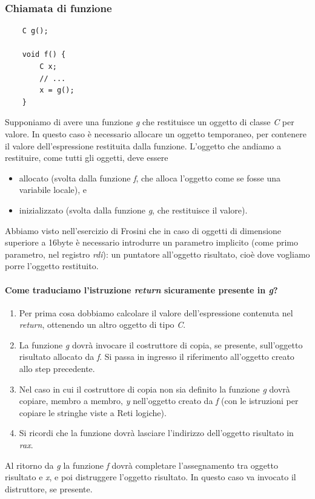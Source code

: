 \subsubsection{Chiamata di funzione}
\begin{verbatim}
	C g();
	
	void f() {
		C x;
		// ...
		x = g();
	}
\end{verbatim}
Supponiamo di avere una funzione \emph{g} che restituisce un oggetto di classe \emph{C} per valore. In questo caso è necessario allocare un oggetto temporaneo, per contenere il valore dell'espressione restituita dalla funzione. L'oggetto che andiamo a restituire, come tutti gli oggetti, deve essere 
\begin{itemize}
	\item allocato (svolta dalla funzione \emph{f}, che alloca l'oggetto come se fosse una variabile locale), e
	\item inizializzato (svolta dalla funzione \emph{g},  che restituisce il valore).
\end{itemize}
Abbiamo visto nell'esercizio di Frosini che in caso di oggetti di dimensione superiore a 16byte è necessario introdurre un parametro implicito (come primo parametro, nel registro \emph{rdi}): un puntatore all'oggetto risultato, cioè dove vogliamo porre l'oggetto restituito.
\paragraph{Come traduciamo l'istruzione \emph{return} sicuramente presente in \emph{g}?} 
\begin{enumerate}
	\item Per prima cosa dobbiamo calcolare il valore dell'espressione contenuta nel \emph{return}, ottenendo un altro oggetto di tipo \emph{C}.
	\item La funzione \emph{g} dovrà invocare il costruttore di copia, se presente, sull'oggetto risultato allocato da \emph{f}. Si passa in ingresso il riferimento all'oggetto creato allo step precedente.
	\item Nel caso in cui il costruttore di copia non sia definito la funzione \emph{g} dovrà copiare, membro a membro, \emph{y} nell'oggetto creato da \emph{f} (con le istruzioni per copiare le stringhe viste a Reti logiche).
	\item Si ricordi che la funzione dovrà lasciare l'indirizzo dell'oggetto risultato in \emph{rax}.
\end{enumerate}
Al ritorno da \emph{g} la funzione \emph{f} dovrà completare l'assegnamento tra oggetto risultato e \emph{x}, e poi distruggere l'oggetto risultato. In questo caso va invocato il distruttore, se presente.
